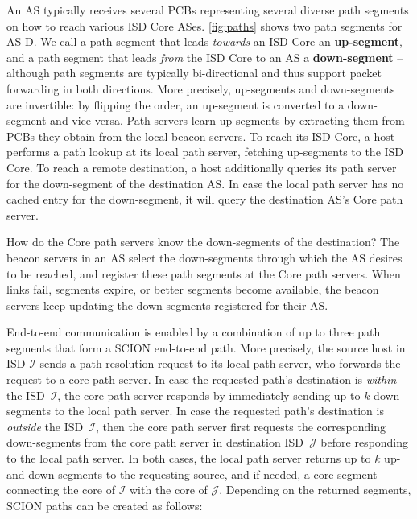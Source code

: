 \documentclass[a4paper]{llncs}
\newcommand\SCION{{\small\textsf{SCION}}\xspace}
\newcommand\D{\textsf{D}\xspace}
\newcommand\cI{\ensuremath{\mathcal{I}}\xspace}
\newcommand\cJ{\ensuremath{\mathcal{J}}\xspace}
\begin{document}
\smallskip
An AS typically receives several PCBs representing several diverse
path segments on how to reach various ISD Core ASes.
\autoref{fig:paths} shows two path segments for AS \D. We call a
path segment that leads \emph{towards} an ISD Core an \textbf{up-segment}, and a path segment that
leads \emph{from} the ISD Core to an AS a \textbf{down-segment} -- although path segments
are typically bi-directional and thus support packet forwarding in both
directions.  More precisely, up-segments and down-segments are invertible: by
flipping the order, an up-segment is converted to a down-segment and vice versa. Path
servers learn up-segments by extracting them from PCBs they obtain from the local
beacon servers. To reach its ISD Core, a host performs a path lookup at its
local path server, fetching up-segments to the ISD Core. To reach a remote
destination, a host additionally queries its path server for the
down-segment of the destination AS. In case the local path server has
no cached entry for the down-segment, it will query the destination
AS's Core path server.

How do the Core path servers know the down-segments of the destination?
The beacon servers in an AS select the down-segments through
which the AS desires to be reached, and register these path segments at the
Core path servers. When links fail, segments expire, or better segments
become available, the beacon servers keep updating the down-segments
registered for their AS.






End-to-end communication is enabled by a combination of up to three
path segments that form a \SCION end-to-end path. More precisely, the
source host in ISD $\cI$ sends a path resolution request to its local
path server, who forwards the request to a core path server. In case
the requested path's destination is \emph{within} the ISD~\cI, the
core path server responds by immediately sending up to $k$
down-segments to the local path server. In case the requested path's
destination is \emph{outside} the ISD~\cI, then the core path server
first requests the corresponding down-segments from the core path
server in destination ISD~\cJ before responding to the local path
server. In both cases, the local path server returns up to $k$ up-
and down-segments to the requesting source, and if needed, a
core-segment connecting the core of $\cI$ with the core of $\cJ$. Depending on the returned
segments, \SCION paths can be created as follows:
\end{document}
